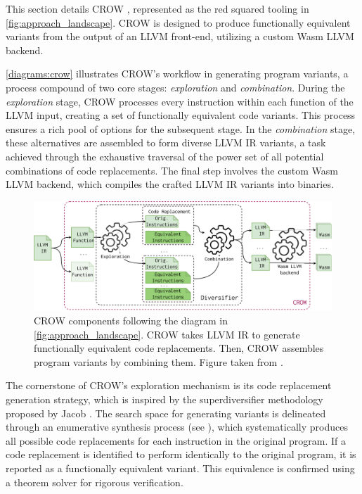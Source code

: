 
\label{section:crow}
\renewcommand{\tool}{CROW\xspace}

This section details CROW \cite{CROW}, represented as the red squared tooling in \autoref{fig:approach_landscape}. 
CROW is designed to produce functionally equivalent \wasm variants from the output of an LLVM front-end, utilizing a custom Wasm LLVM backend.

\autoref{diagrams:crow} illustrates CROW's workflow in generating program variants, a process compound of two core stages: \textit{exploration} and \textit{combination}. 
During the \textit{exploration} stage, CROW processes every instruction within each function of the LLVM input, creating a set of functionally equivalent code variants. 
This process ensures a rich pool of options for the subsequent stage.
In the \textit{combination} stage, these alternatives are assembled to form diverse LLVM IR variants, a task achieved through the exhaustive traversal of the power set of all potential combinations of code replacements. 
The final step involves the custom Wasm LLVM backend, which compiles the crafted LLVM IR variants into \wasm binaries. 


\begin{figure}[h]
    \includegraphics[width=\linewidth]{diagrams/generation/crow.drawio.pdf}
    \caption{CROW components following the diagram in \autoref{fig:approach_landscape}. CROW takes LLVM IR to generate functionally equivalent code replacements. Then, CROW assembles program variants by combining them. Figure taken from \cite{Lic}.}
    \label{diagrams:crow}
\end{figure}



The cornerstone of CROW's exploration mechanism is its code replacement generation strategy, which is inspired by the superdiversifier methodology proposed by Jacob \etal \cite{jacob2008superdiversifier}. 
The search space for generating variants is delineated through an enumerative synthesis process (see ), which systematically produces all possible code replacements for each instruction in the original program. 
If a code replacement is identified to perform identically to the original program, it is reported as a functionally equivalent variant.
This equivalence is confirmed using a theorem solver for rigorous verification.

